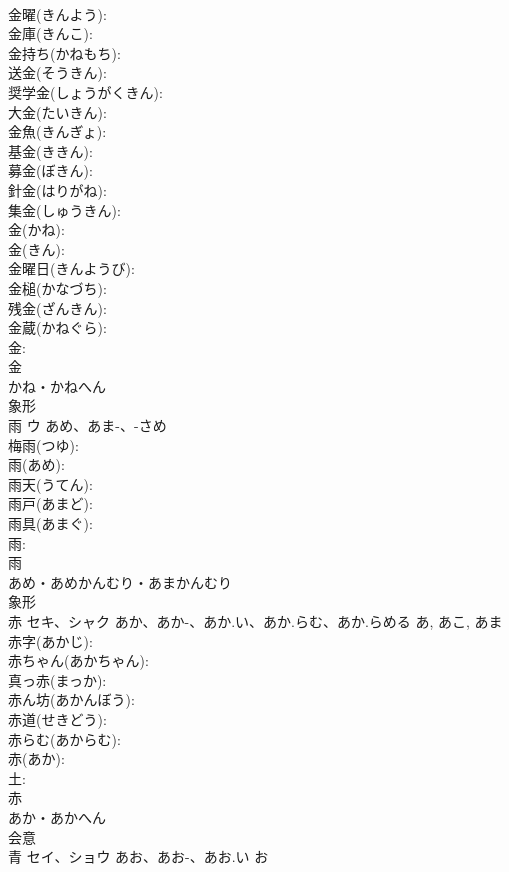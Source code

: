 \documentclass[8pt]{extreport}
\begin{document}
\begin{CJK}{UTF8}{min}
\\	金曜(きんよう): 
\\	金庫(きんこ): 
\\	金持ち(かねもち): 
\\	送金(そうきん): 
\\	奨学金(しょうがくきん): 
\\	大金(たいきん): 
\\	金魚(きんぎょ): 
\\	基金(ききん): 
\\	募金(ぼきん): 
\\	針金(はりがね): 
\\	集金(しゅうきん): 
\\	金(かね): 
\\	金(きん): 
\\	金曜日(きんようび): 
\\	金槌(かなづち): 
\\	残金(ざんきん): 
\\	金蔵(かねぐら): 
\\	金: 
\\	金	
\\	かね・かねへん	
\\	象形 
\\	雨	ウ	あめ、あま-、-さめ		
\\	梅雨(つゆ): 
\\	雨(あめ): 
\\	雨天(うてん): 
\\	雨戸(あまど): 
\\	雨具(あまぐ): 
\\	雨: 
\\	雨	
\\	あめ・あめかんむり・あまかんむり	
\\	象形 
\\	赤	セキ、シャク	あか、あか-、あか.い、あか.らむ、あか.らめる	あ, あこ, あま	
\\	赤字(あかじ): 
\\	赤ちゃん(あかちゃん): 
\\	真っ赤(まっか): 
\\	赤ん坊(あかんぼう): 
\\	赤道(せきどう): 
\\	赤らむ(あからむ): 
\\	赤(あか): 
\\	土: 
\\	赤	
\\	あか・あかへん	
\\	会意 
\\	青	セイ、ショウ	あお、あお-、あお.い	お	

\end{CJK}
\end{document}
